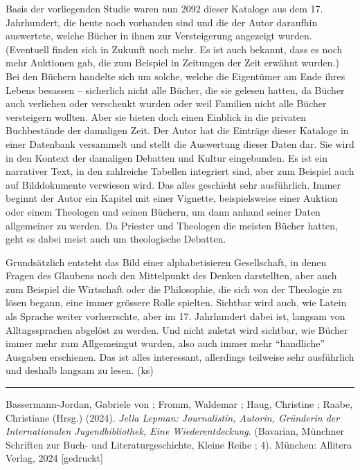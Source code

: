 \documentclass[a4paper,
fontsize=11pt,
oneside,
numbers=noperiodatend,
parskip=half-,
bibliography=totoc,
final
]{scrartcl}
\begin{document}
Basis der vorliegenden Studie waren nun 2092 dieser Kataloge aus dem 17.
Jahrhundert, die heute noch vorhanden sind und die der Autor daraufhin
auswertete, welche Bücher in ihnen zur Versteigerung angezeigt wurden.
(Eventuell finden sich in Zukunft noch mehr. Es ist auch bekannt, dass
es noch mehr Auktionen gab, die zum Beispiel in Zeitungen der Zeit
erwähnt wurden.) Bei den Büchern handelte sich um solche, welche die
Eigentümer am Ende ihres Lebens besassen -- sicherlich nicht alle
Bücher, die sie gelesen hatten, da Bücher auch verliehen oder verschenkt
wurden oder weil Familien nicht alle Bücher versteigern wollten. Aber
sie bieten doch einen Einblick in die privaten Buchbestände der
damaligen Zeit. Der Autor hat die Einträge dieser Kataloge in einer
Datenbank versammelt und stellt die Auswertung dieser Daten dar. Sie
wird in den Kontext der damaligen Debatten und Kultur eingebunden. Es
ist ein narrativer Text, in den zahlreiche Tabellen integriert sind,
aber zum Beispiel auch auf Bilddokumente verwiesen wird. Das alles
geschieht sehr ausführlich. Immer beginnt der Autor ein Kapitel mit
einer Vignette, beispielsweise einer Auktion oder einem Theologen und
seinen Büchern, um dann anhand seiner Daten allgemeiner zu werden. Da
Priester und Theologen die meisten Bücher hatten, geht es dabei meist
auch um theologische Debatten.

Grundsätzlich entsteht das Bild einer alphabetisieren Gesellschaft, in
denen Fragen des Glaubens noch den Mittelpunkt des Denken darstellten,
aber auch zum Beispiel die Wirtschaft oder die Philosophie, die sich von
der Theologie zu lösen begann, eine immer grössere Rolle spielten.
Sichtbar wird auch, wie Latein als Sprache weiter vorherrschte, aber im
17. Jahrhundert dabei ist, langsam von Alltagssprachen abgelöst zu
werden. Und nicht zuletzt wird sichtbar, wie Bücher immer mehr zum
Allgemeingut wurden, also auch immer mehr \enquote{handliche} Ausgaben
erschienen. Das ist alles interessant, allerdings teilweise sehr
ausführlich und deshalb langsam zu lesen. (ks)

\begin{center}\rule{0.5\linewidth}{0.5pt}\end{center}

Bassermann-Jordan, Gabriele von ; Fromm, Waldemar ; Haug, Christine ;
Raabe, Christiane (Hrsg.) (2024). \emph{Jella Lepman: Journalistin,
Autorin, Gründerin der Internationalen Jugendbibliothek, Eine
Wiederentdeckung}. (Bavarian, Münchner Schriften zur Buch- und
Literaturgeschichte, Kleine Reihe ; 4). München: Allitera Verlag, 2024
{[}gedruckt{]}
\end{document}
